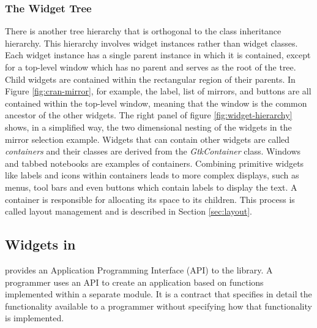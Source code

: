 \documentclass[article]{jss}
\begin{document}
\subsubsection{The Widget Tree}

There is another tree hierarchy that is orthogonal to the class
inheritance hierarchy. This hierarchy involves widget instances rather
than widget classes. Each widget instance has a single parent instance
in which it is contained, except for a top-level window which has no parent
and serves as the root of the tree. Child widgets are contained within the rectangular region of their parents.
In Figure \ref{fig:cran-mirror}, for
example, the label, list of mirrors, and buttons are all contained
within the top-level window, meaning that the window is the common
ancestor of the other widgets.  The right panel of figure
\ref{fig:widget-hierarchy} shows, in a simplified way, the two
dimensional nesting of the widgets in the mirror selection
example. Widgets that can contain other widgets are called
\emph{containers} and their classes are derived from the
\emph{GtkContainer} class. Windows and tabbed notebooks are examples
of containers.  Combining primitive widgets like labels and icons
within containers leads to more complex displays, such as menus,
tool bars and even buttons which contain labels to display the text. A
container is responsible for allocating its space to its
children. This process is called layout management and is described in
Section \ref{sec:layout}.

\subsection[GTK+ Widgets in R]{ Widgets in }

 provides an Application Programming Interface (API) to the
library. A programmer uses an API to create an application based on functions implemented
within a separate module. It is a contract that specifies in detail
the functionality available to a programmer without specifying how
that functionality is implemented. 
 
\end{document}
